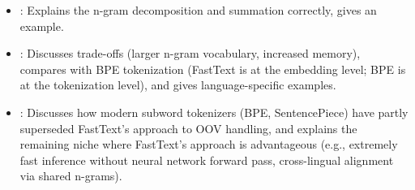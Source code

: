 \begin{interviewq}
\goodgreat
\begin{itemize}
    \item {}: Explains the n-gram decomposition and summation
    correctly, gives an example.
    \item {}: Discusses trade-offs (larger n-gram vocabulary,
    increased memory), compares with BPE tokenization (FastText is at the
    embedding level; BPE is at the tokenization level), and gives
    language-specific examples.
    \item {}: Discusses how modern subword tokenizers (BPE,
    SentencePiece) have partly superseded FastText's approach to OOV
    handling, and explains the remaining niche where FastText's approach
    is advantageous (e.g., extremely fast inference without neural network
    forward pass, cross-lingual alignment via shared n-grams).
\end{itemize}

\end{interviewq}

\vspace{0.5em}

